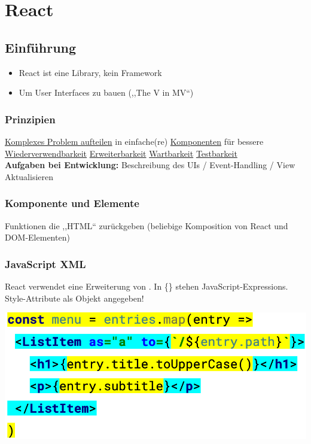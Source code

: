 

\section{React}

\subsection{Einführung}
\begin{itemize}
    \item React ist eine Library, kein Framework
    \item Um User Interfaces zu bauen (,,The V in MV``)
\end{itemize}

\subsubsection{Prinzipien}
\underline{Komplexes Problem aufteilen} in einfache(re) \underline{Komponenten} für bessere \underline{Wiederverwendbarkeit} \underline{Erweiterbarkeit} \underline{Wartbarkeit} \underline{Testbarkeit}\\
\textbf{Aufgaben bei Entwicklung:} Beschreibung des UIs / Event-Handling / View Aktualisieren

\subsubsection{Komponente und Elemente}
Funktionen die ,,HTML`` zurückgeben (beliebige Komposition von React und DOM-Elementen)

\subsubsection{JavaScript XML}
\begin{minipage}{0.45\linewidth}
    React verwendet  eine Erweiterung von . In \{\} stehen JavaScript-Expressions. Style-Attribute als Objekt angegeben!
\end{minipage}
\begin{minipage}{0.5\linewidth}
    \begin{center}
        \includegraphics[width=1.14\linewidth]{./img/02-react/javascript_xml}
        \vspace{-8pt}
    \end{center}
\end{minipage}

